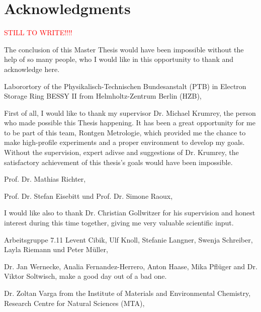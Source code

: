 \pagestyle{empty}
\noindent
\section*{Acknowledgments}

\textcolor{red}{STILL TO WRITE!!!!}
\vspace{2ex}

The conclusion of this Master Thesis would have been impossible without the help of so many people, who I would like in this opportunity to thank and acknowledge here.
\vspace{2ex}

\noindent Laborortory of the Physikalisch-Technischen Bundesanstalt (PTB) in Electron Storage Ring BESSY II from Helmholtz-Zentrum Berlin (HZB),
\vspace{2ex}

\noindent First of all, I would like to thank my supervisor Dr. Michael Krumrey, the person who made possible this Thesis happening. It has been a great opportunity for me to be part of this team, Rontgen Metrologie, which provided me the chance to make high-profile experiments and a proper environment to develop my goals. Without the supervision, expert adivse and suggestions of Dr. Krumrey, the satisfactory achievement of this thesis’s goals would have been impossible.
\vspace{2ex}

\noindent Prof. Dr. Mathias Richter,
\vspace{2ex}

\noindent Prof. Dr. Stefan Eisebitt und Prof. Dr. Simone Raoux,
\vspace{2ex}

\noindent I would like also to thank Dr. Christian Gollwitzer for his supervision and honest interest during this time together, giving me very valuable scientific input.
\vspace{2ex}

\noindent Arbeitsgruppe 7.11 Levent Cibik, Ulf Knoll, Stefanie Langner, Swenja Schreiber, Layla Riemann und Peter Müller,
\vspace{2ex}

\noindent Dr. Jan Wernecke, Analia Fernandez-Herrero, Anton Haase, Mika Pflüger and Dr. Viktor Soltwisch, make a good day out of a bad one. 
\vspace{2ex}

\noindent Dr. Zoltan Varga from the Institute of Materials and Environmental Chemistry, Research Centre for Natural Sciences (MTA),
\vspace{2ex}

